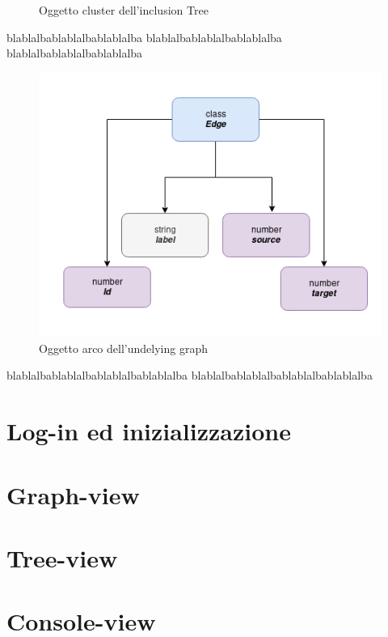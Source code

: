 {\begin{figure}[!htb]
\begin{center}
	\end{center}
	\caption{Oggetto cluster dell'inclusion Tree\label{fig:clusterClass}}
\end{figure}
blablalbablablalbablablalba
blablalbablablalbablablalba
blablalbablablalbablablalba
\begin{figure}[!htb]
	\begin{center}
		\includegraphics[width=1 \linewidth]{figure/edgeClass}
	\end{center}
	\caption{Oggetto arco dell'undelying graph\label{fig:edgeClass}}
\end{figure}

blablalbablablalbablablalbablablalba
blablalbablablalbablablalbablablalba



\section{Log-in ed inizializzazione}

\section{Graph-view}
\section{Tree-view}
\section{Console-view}

}
